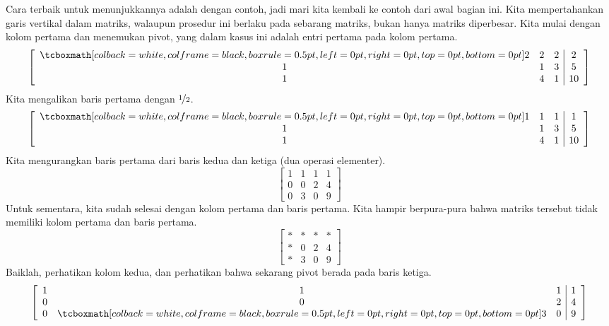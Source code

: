 Cara terbaik untuk menunjukkannya adalah dengan contoh, jadi mari kita kembali ke
contoh dari awal bagian ini.
Kita mempertahankan garis vertikal dalam matriks,
walaupun prosedur ini berlaku pada sebarang matriks, bukan hanya
matriks diperbesar.
Kita mulai dengan kolom pertama dan menemukan pivot, yang dalam
kasus ini adalah entri pertama pada kolom pertama.
\begin{equation*}
\left[
\begin{array}{ccc|c}
\mybxsm{2} & 2 & 2 & 2 \\
1 & 1 & 3 & 5 \\
1 & 4 & 1 & 10
\end{array}
\right]
\end{equation*}
Kita mengalikan baris pertama dengan
$\nicefrac{1}{2}$.
\begin{equation*}
\left[
\begin{array}{ccc|c}
\mybxsm{1} & 1 & 1 & 1 \\
1 & 1 & 3 & 5 \\
1 & 4 & 1 & 10
\end{array}
\right]
\end{equation*}
Kita mengurangkan baris pertama dari baris kedua dan ketiga (dua operasi
elementer).
\begin{equation*}
\left[
\begin{array}{ccc|c}
1 & 1 & 1 & 1 \\
0 & 0 & 2 & 4 \\
0 & 3 & 0 & 9
\end{array}
\right]
\end{equation*}
Untuk sementara, kita sudah selesai dengan kolom pertama dan baris pertama. Kita hampir
berpura-pura bahwa matriks tersebut tidak memiliki kolom pertama dan baris pertama.
\begin{equation*}
\left[
\begin{array}{ccc|c}
* & * & * & * \\
* & 0 & 2 & 4 \\
* & 3 & 0 & 9
\end{array}
\right]
\end{equation*}
Baiklah\@, perhatikan kolom kedua, dan perhatikan bahwa sekarang pivot berada pada
baris ketiga.
\begin{equation*}
\left[
\begin{array}{ccc|c}
1 & 1 & 1 & 1 \\
0 & 0 & 2 & 4 \\
0 & \mybxsm{3} & 0 & 9
\end{array}
\right]
\end{equation*}

